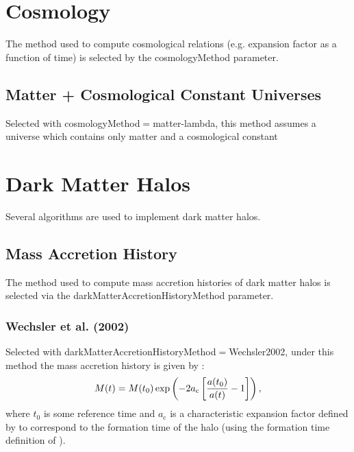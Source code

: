 \section{Cosmology}

The method used to compute cosmological relations (e.g. expansion factor as a function of time) is selected by the {\normalfont \ttfamily cosmologyMethod} parameter.

\subsection{Matter + Cosmological Constant Universes}

Selected with {\normalfont \ttfamily cosmologyMethod}$=${\normalfont \ttfamily matter-lambda}, this method assumes a universe which contains only matter and a cosmological constant

\section{Dark Matter Halos}

Several algorithms are used to implement dark matter halos.

\subsection{Mass Accretion History}

The method used to compute mass accretion histories of dark matter halos is selected via the {\normalfont \ttfamily darkMatterAccretionHistoryMethod} parameter.

\subsubsection{Wechsler et al. (2002)}

Selected with {\normalfont \ttfamily darkMatterAccretionHistoryMethod}$=${\normalfont \ttfamily Wechsler2002}, under this method the mass accretion history is given by \citep{wechsler_concentrations_2002}:
\begin{equation}
M(t) = M(t_0) \exp \left( - 2 a_{\mathrm c} \left[ {a(t_0)\over a(t)}-1 \right] \right),
\end{equation}
where $t_0$ is some reference time and $a_{\mathrm c}$ is a characteristic expansion factor defined by \cite{wechsler_concentrations_2002} to correspond to the formation time of the halo (using the formation time definition of \citealt{bullock_profiles_2001}).

